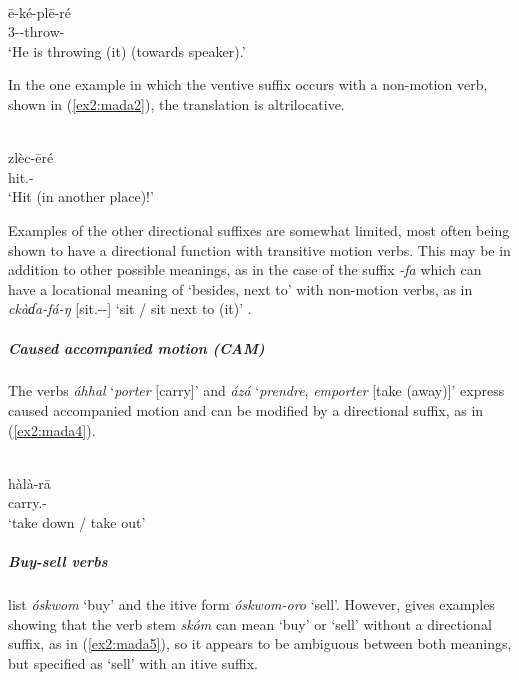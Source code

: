 \ea\label{ex2:mada1}
 \\
\gll ē-ké-plē-ré \\
3--throw-	\\
\glt `He is throwing (it) (towards speaker).'
\z 

In the one example in which the ventive suffix occurs with a non-motion verb, shown in (\ref{ex2:mada2}), the translation is altrilocative. 

\ea\label{ex2:mada2}
 \\
\gll  zlèc-ēré \\
hit.-		\\
\glt `Hit (in another place)!'
\z 

Examples of the other directional suffixes are somewhat limited, most often being shown to have a directional function with transitive motion verbs. This may be in addition to other possible meanings, as in the case of the suffix \textit{-fa} which can have a locational meaning of `besides, next to' with non-motion verbs, as in \textit{ckàɗa-fá-ŋ} [sit.--] `sit / sit next to (it)' \citep[46]{ernstkurdiTenseAspectMood2016}.

\subparagraph{Caused accompanied motion (CAM)}

The verbs \textit{áhhal} `\textit{porter} [carry]' and \textit{ázá} `\textit{prendre}, \textit{emporter} [take (away)]' express caused accompanied motion and can be modified by a directional suffix, as in (\ref{ex2:mada4}). 

\ea\label{ex2:mada4}
 \\
\gll hàlà-rā	\\
carry.- \\
\glt `take down / take out'
\z 

\subparagraph{Buy-sell verbs}

\citet[240]{barreteau2000dictionnaire} list \textit{óskwom} `buy' and the itive form \textit{óskwom-oro} `sell'. However, \citet{ernstkurdiTenseAspectMood2016} gives examples showing that the verb stem \textit{skóm} can mean `buy' or `sell' without a directional suffix, as in (\ref{ex2:mada5}), so it appears to be ambiguous between both meanings, but specified as `sell' with an itive suffix.

